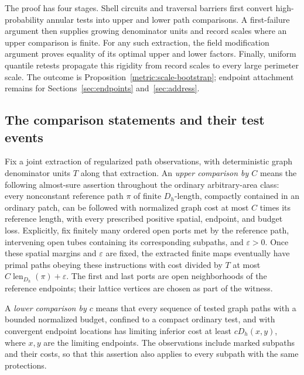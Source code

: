 The proof has four stages. Shell circuits and traversal barriers first
convert high-probability annular tests into upper and lower path
comparisons. A first-failure argument then supplies growing denominator
units and record scales where an upper comparison is finite. For any such
extraction, the field modification argument proves equality of its optimal
upper and lower factors. Finally, uniform quantile retests propagate this
rigidity from record scales to every large perimeter scale. The outcome
is Proposition~\ref{metric:scale-bootstrap}; endpoint attachment remains
for Sections~\ref{sec:endpoints} and~\ref{sec:address}.

\subsection{The comparison statements and their test events}

\begin{definition}\label{metric:comparisons}
Fix a joint extraction of regularized path observations, with deterministic
graph denominator units $T$ along that extraction.
An \emph{upper comparison by $C$} means the following almost-sure assertion
throughout the ordinary arbitrary-area class: every nonconstant reference
path $\pi$ of finite $D_h$-length, compactly contained in an ordinary patch, can be
followed with normalized graph cost at most $C$ times its reference length,
with every prescribed positive spatial, endpoint, and budget loss.
Explicitly, fix finitely many ordered open ports met by the reference
path, intervening open tubes containing its corresponding subpaths, and
\(\varepsilon>0\). Once these spatial margins and \(\varepsilon\) are
fixed, the extracted finite maps eventually have primal paths obeying
these instructions with cost divided by \(T\) at most
\(C\operatorname{len}_{D_h}(\pi)+\varepsilon\). The first and last
ports are open neighborhoods of the reference endpoints; their lattice
vertices are chosen as part of the witness.

A \emph{lower comparison by $c$} means that every sequence of tested graph
paths with a bounded normalized budget, confined to a compact ordinary test,
and with convergent endpoint locations has limiting inferior cost at least
$cD_h(x,y)$, where $x,y$ are the limiting endpoints. The observations include
marked subpaths and their costs, so that this assertion also applies to
every subpath with the same protections.
\end{definition}

